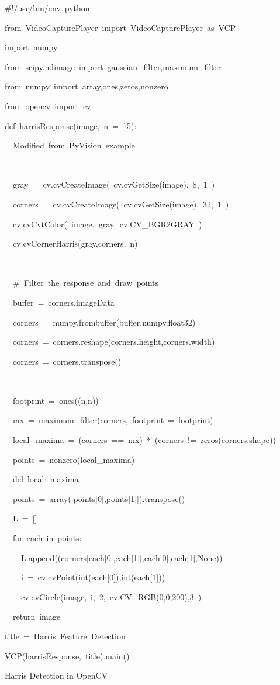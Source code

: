 \documentclass[english]{IEEEtran}
\theoremstyle{plain}
\newenvironment{lyxcode}
{\par\begin{list}{}{
\setlength{\rightmargin}{\leftmargin}
\setlength{\listparindent}{0pt}%
\raggedright
\setlength{\itemsep}{0pt}
\setlength{\parsep}{0pt}
\normalfont\ttfamily}%
 \item[]}
{\end{list}}
\begin{document}
%
\begin{algorithm*}
\begin{lyxcode}
\#!/usr/bin/env~python

from~VideoCapturePlayer~import~VideoCapturePlayer~as~VCP

import~numpy

from~scipy.ndimage~import~gaussian\_filter,maximum\_filter

from~numpy~import~array,ones,zeros,nonzero

from~opencv~import~cv



def~harrisResponse(image,~n~=~15):

~~\textquotedbl{}\textquotedbl{}\textquotedbl{}Modified~from~PyVision~example

~~\textquotedbl{}\textquotedbl{}\textquotedbl{}

~~gray~=~cv.cvCreateImage(~cv.cvGetSize(image),~8,~1~)

~~corners~=~cv.cvCreateImage(~cv.cvGetSize(image),~32,~1~)

~~cv.cvCvtColor(~image,~gray,~cv.CV\_BGR2GRAY~)

~~cv.cvCornerHarris(gray,corners,~n)

~~

~~\#~Filter~the~response~and~draw~points

~~buffer~=~corners.imageData

~~corners~=~numpy.frombuffer(buffer,numpy.float32)

~~corners~=~corners.reshape(corners.height,corners.width)

~~corners~=~corners.transpose()

~~

~~footprint~=~ones((n,n))

~~mx~=~maximum\_filter(corners,~footprint~=~footprint)

~~local\_maxima~=~(corners~==~mx)~{*}~(corners~!=~zeros(corners.shape))

~~points~=~nonzero(local\_maxima)

~~del~local\_maxima

~~points~=~array({[}points{[}0{]},points{[}1{]}{]}).transpose()

~~L~=~{[}{]}

~~for~each~in~points:

~~~~L.append((corners{[}each{[}0{]},each{[}1{]}{]},each{[}0{]},each{[}1{]},None))

~~~~i~=~cv.cvPoint(int(each{[}0{]}),int(each{[}1{]}))

~~~~cv.cvCircle(image,~i,~2,~cv.CV\_RGB(0,0,200),3~)



~~return~image



title~=~\textquotedbl{}Harris~Feature~Detection\textquotedbl{}

VCP(harrisResponse,~title).main()
\end{lyxcode}
\caption{\label{alg:Harris-Detection-opencv}Harris Detection in OpenCV}

\end{algorithm*}
\end{document}
